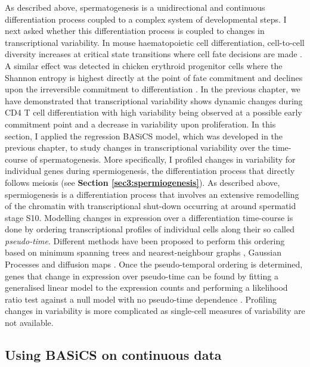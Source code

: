 As described above, spermatogenesis is a unidirectional and continuous differentiation process coupled to a complex system of developmental steps. 
I next asked whether this differentiation process is coupled to changes in transcriptional variability. 
In mouse haematopoietic cell differentiation, cell-to-cell diversity increases at critical state transitions where cell fate decisions are made \citep{Mojtahedi2016}. 
A similar effect was detected in chicken erythroid progenitor cells where the Shannon entropy is highest directly at the point of fate commitment and declines upon the irreversible commitment to differentiation \cite{Richard2016}. 
In the previous chapter, we have demonstrated that transcriptional variability shows dynamic changes during CD4\plus{} T cell differentiation with high variability being observed at a possible early commitment point and a decrease in variability upon proliferation. 
In this section, I applied the regression BASiCS model, which was developed in the previous chapter, to study changes in transcriptional variability over the time-course of spermatogenesis. 
More specifically, I profiled changes in variability for individual genes during spermiogenesis, the differentiation process that directly follows meiosis (see \textbf{Section \ref{sec3:spermiogenesis}}). 
As described above, spermiogenesis is a differentiation process that involves an extensive remodelling of the chromatin with transcriptional shut-down occurring at around spermatid stage S10. 
Modelling changes in expression over a differentiation time-course is done by ordering transcriptional profiles of individual cells along their so called \emph{pseudo-time}. 
Different methods have been proposed to perform this ordering based on minimum spanning trees \citep{Trapnell2014} and nearest-neighbour graphs \cite{Setty2016}, Gaussian Processes \citep{Reid2016, Campbell2016b} and diffusion maps \citep{Haghverdi2016}. 
Once the pseudo-temporal ordering is determined, genes that change in expression over pseudo-time can be found by fitting a generalised linear model to the expression counts and performing a likelihood ratio test against a null model with no pseudo-time dependence \citep{Trapnell2014}. 
Profiling changes in variability is more complicated as single-cell measures of variability are not available. 

\subsection{Using BASiCS on continuous data}

